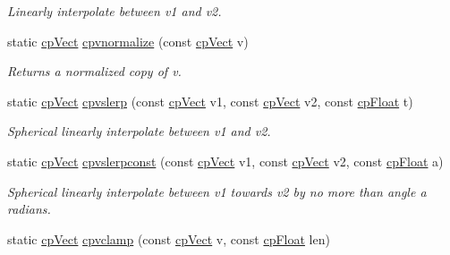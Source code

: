 \begin{DoxyCompactItemize}
\begin{DoxyCompactList}\small\item\em Linearly interpolate between v1 and v2. \end{DoxyCompactList}\item 
\hypertarget{group__cp_vect_ga0fd46c6ef6dcca0dc7b6c6cef8008758}{}static \hyperlink{structcp_vect}{cp\+Vect} \hyperlink{group__cp_vect_ga0fd46c6ef6dcca0dc7b6c6cef8008758}{cpvnormalize} (const \hyperlink{structcp_vect}{cp\+Vect} v)\label{group__cp_vect_ga0fd46c6ef6dcca0dc7b6c6cef8008758}

\begin{DoxyCompactList}\small\item\em Returns a normalized copy of v. \end{DoxyCompactList}\item 
\hypertarget{group__cp_vect_ga6c7b8f231543383431aeb80e61255e04}{}static \hyperlink{structcp_vect}{cp\+Vect} \hyperlink{group__cp_vect_ga6c7b8f231543383431aeb80e61255e04}{cpvslerp} (const \hyperlink{structcp_vect}{cp\+Vect} v1, const \hyperlink{structcp_vect}{cp\+Vect} v2, const \hyperlink{group__basic_types_gac1ed65573e035bf892505768c852d8d3}{cp\+Float} t)\label{group__cp_vect_ga6c7b8f231543383431aeb80e61255e04}

\begin{DoxyCompactList}\small\item\em Spherical linearly interpolate between v1 and v2. \end{DoxyCompactList}\item 
\hypertarget{group__cp_vect_gad81f538a3add6e5e1498645ebecb8ed1}{}static \hyperlink{structcp_vect}{cp\+Vect} \hyperlink{group__cp_vect_gad81f538a3add6e5e1498645ebecb8ed1}{cpvslerpconst} (const \hyperlink{structcp_vect}{cp\+Vect} v1, const \hyperlink{structcp_vect}{cp\+Vect} v2, const \hyperlink{group__basic_types_gac1ed65573e035bf892505768c852d8d3}{cp\+Float} a)\label{group__cp_vect_gad81f538a3add6e5e1498645ebecb8ed1}

\begin{DoxyCompactList}\small\item\em Spherical linearly interpolate between v1 towards v2 by no more than angle a radians. \end{DoxyCompactList}\item 
\hypertarget{group__cp_vect_ga21bac66ee11661debe4d1ddfb710f5f8}{}static \hyperlink{structcp_vect}{cp\+Vect} \hyperlink{group__cp_vect_ga21bac66ee11661debe4d1ddfb710f5f8}{cpvclamp} (const \hyperlink{structcp_vect}{cp\+Vect} v, const \hyperlink{group__basic_types_gac1ed65573e035bf892505768c852d8d3}{cp\+Float} len)\label{group__cp_vect_ga21bac66ee11661debe4d1ddfb710f5f8}


\end{DoxyCompactItemize}

